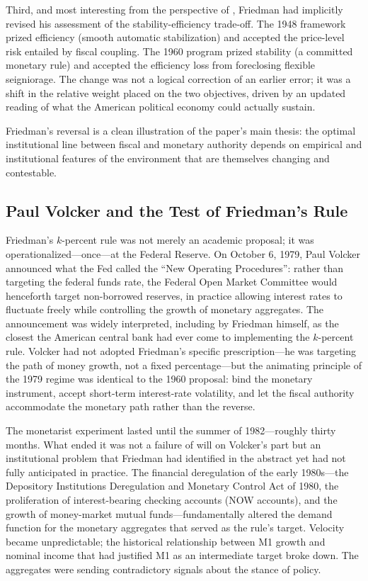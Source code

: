 \documentclass[12pt]{article}
\begin{document}
Third, and most interesting from the perspective of
\citet{Sargent2011}, Friedman had implicitly revised his assessment of
the stability-efficiency trade-off.  The 1948 framework prized efficiency
(smooth automatic stabilization) and accepted the price-level risk
entailed by fiscal coupling.  The 1960 program prized stability
(a committed monetary rule) and accepted the efficiency loss from
foreclosing flexible seigniorage.  The change was not a logical
correction of an earlier error; it was a shift in the relative weight
placed on the two objectives, driven by an updated reading of what
the American political economy could actually sustain.

Friedman's reversal is a clean illustration of the paper's main thesis:
the optimal institutional line between fiscal and monetary authority
depends on empirical and institutional features of the environment that
are themselves changing and contestable.

\subsection{Paul Volcker and the Test of Friedman's Rule}

Friedman's $k$-percent rule was not merely an academic proposal; it was
operationalized---once---at the Federal Reserve.  On October 6, 1979,
Paul Volcker announced what the Fed called the ``New Operating
Procedures'': rather than targeting the federal funds rate, the Federal
Open Market Committee would henceforth target non-borrowed reserves,
in practice allowing interest rates to fluctuate freely while controlling
the growth of monetary aggregates.  The announcement was widely
interpreted, including by Friedman himself, as the closest the American
central bank had ever come to implementing the $k$-percent rule.
Volcker had not adopted Friedman's specific prescription---he was
targeting the path of money growth, not a fixed percentage---but the
animating principle of the 1979 regime was identical to the 1960
proposal: bind the monetary instrument, accept short-term
interest-rate volatility, and let the fiscal authority accommodate the
monetary path rather than the reverse.

The monetarist experiment lasted until the summer of 1982---roughly
thirty months.  What ended it was not a failure of will on Volcker's
part but an institutional problem that Friedman had identified in the
abstract yet had not fully anticipated in practice.  The financial
deregulation of the early 1980s---the Depository Institutions
Deregulation and Monetary Control Act of 1980, the proliferation of
interest-bearing checking accounts (NOW accounts), and the growth of
money-market mutual funds---fundamentally altered the demand function for
the monetary aggregates that served as the rule's target.  Velocity
became unpredictable; the historical relationship between M1 growth and
nominal income that had justified M1 as an intermediate target broke
down.  The aggregates were sending contradictory signals about the stance
of policy.
\end{document}
